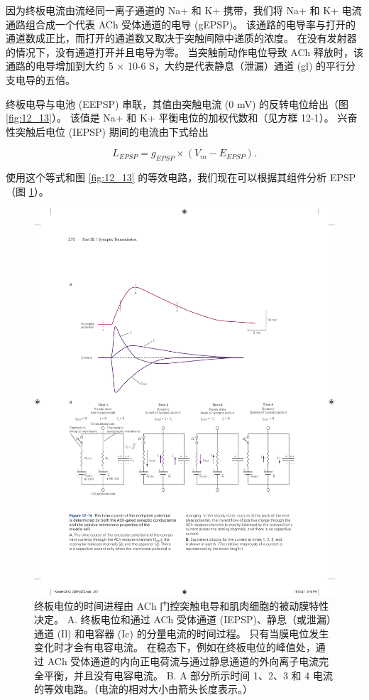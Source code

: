 因为终板电流由流经同一离子通道的 Na+ 和 K+ 携带，我们将 Na+ 和 K+ 电流通路组合成一个代表 ACh 受体通道的电导 (gEPSP)。 
该通路的电导率与打开的通道数成正比，而打开的通道数又取决于突触间隙中递质的浓度。 
在没有发射器的情况下，没有通道打开并且电导为零。 
当突触前动作电位导致 ACh 释放时，该通路的电导增加到大约 5 × 10-6 S，大约是代表静息（泄漏）通道 (gl) 的平行分支电导的五倍。


终板电导与电池 (EEPSP) 串联，其值由突触电流 (0 mV) 的反转电位给出（图 \ref{fig:12_13}）。 
该值是 Na+ 和 K+ 平衡电位的加权代数和（见方框 12-1）。 
兴奋性突触后电位 (IEPSP) 期间的电流由下式给出


\begin{equation}\label{excitatory_potential}
	L_{EPSP} = g_{EPSP} \times (V_m - E_{EPSP}).
\end{equation}

使用这个等式和图 \ref{fig:12_13} 的等效电路，我们现在可以根据其组件分析 EPSP（图 \ref{fig:12_14}）。

\begin{figure}[htbp]
	\centering
	\includegraphics[width=0.95\linewidth]{chap12/fig_12_14}
	\caption{终板电位的时间进程由 ACh 门控突触电导和肌肉细胞的被动膜特性决定。 A. 终板电位和通过 ACh 受体通道 (IEPSP)、静息（或泄漏）通道 (Il) 和电容器 (Ic) 的分量电流的时间过程。 只有当膜电位发生变化时才会有电容电流。 在稳态下，例如在终板电位的峰值处，通过 ACh 受体通道的内向正电荷流与通过静息通道的外向离子电流完全平衡，并且没有电容电流。 B. A 部分所示时间 1、2、3 和 4 电流的等效电路。（电流的相对大小由箭头长度表示。）}
	\label{fig:12_14}
\end{figure}


